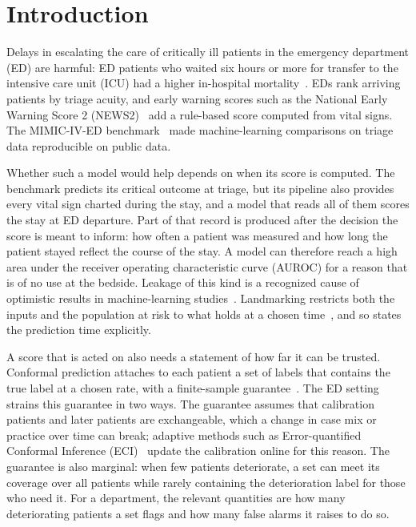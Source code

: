 \section{Introduction}
\label{sec:introduction}

Delays in escalating the care of critically ill patients in the emergency department (ED) are harmful: ED patients who waited six hours or
more for transfer to the intensive care unit (ICU) had a higher in-hospital mortality~\cite{chalfin2007delayed}. EDs rank arriving
patients by triage acuity, and early warning scores such as the National Early Warning Score 2 (NEWS2)~\cite{rcp2017news2} add a rule-based score computed from vital signs.
The MIMIC-IV-ED benchmark~\cite{xie2022mimic4ed} made machine-learning comparisons on triage data reproducible on public data.

Whether such a model would help depends on when its score is computed. The benchmark predicts its critical outcome at triage, but its pipeline also provides every vital sign charted during the stay, and a model that reads all of them scores the stay at ED departure. Part of that record is produced after the decision the score is meant to inform: how often a patient was measured and how long the patient
stayed reflect the course of the stay. A model can therefore reach a high area under the receiver operating characteristic curve (AUROC) for a reason that is of
no use at the bedside. Leakage of this kind is a recognized cause of optimistic results in machine-learning studies~\cite{kapoor2023leakage}. Landmarking restricts both the inputs and the
population at risk to what holds at a chosen time~\cite{vanhouwelingen2007landmarking}, and so states the prediction time explicitly.

A score that is acted on also needs a statement of how far it can be trusted. Conformal prediction attaches to each patient a set of labels that contains the true
label at a chosen rate, with a finite-sample guarantee~\cite{lei2018distributionfree,vovk2022algorithmic}. The ED setting strains this guarantee in two ways. The
guarantee assumes that calibration patients and later patients are exchangeable, which a change in case mix or practice over time can break; adaptive methods such as
Error-quantified Conformal Inference (ECI)~\cite{wu2025eci} update the calibration online for this reason. The guarantee is also marginal: when few patients deteriorate,
a set can meet its coverage over all patients while rarely containing the deterioration label for those who need it. For a department, the relevant quantities are how
many deteriorating patients a set flags and how many false alarms it raises to do so.

